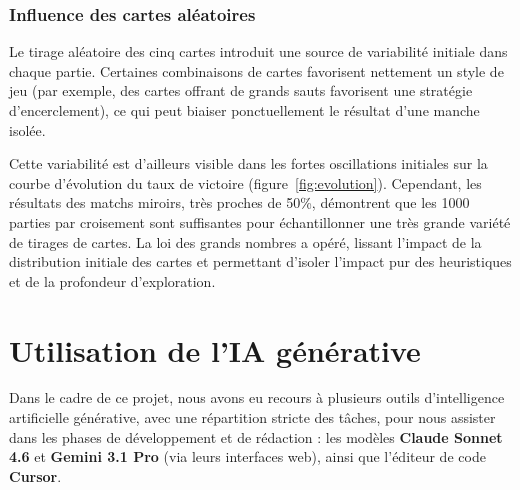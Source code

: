 \documentclass[12pt, a4paper]{article}
\begin{document}
\subsubsection{Influence des cartes aléatoires}

Le tirage aléatoire des cinq cartes introduit une source de variabilité initiale dans chaque partie.
Certaines combinaisons de cartes favorisent nettement un style de jeu (par exemple, des cartes
offrant de grands sauts favorisent une stratégie d'encerclement), ce qui peut biaiser ponctuellement
le résultat d'une manche isolée.

Cette variabilité est d'ailleurs visible dans les fortes oscillations initiales sur la courbe d'évolution du
taux de victoire (figure~\ref{fig:evolution}). Cependant, les résultats des matchs miroirs, très proches de 50\%, démontrent que les 1000 parties par croisement sont suffisantes pour échantillonner une
très grande variété de tirages de cartes. La loi des grands nombres a opéré, lissant l'impact de la distribution initiale des cartes et permettant d'isoler l'impact pur des heuristiques et de la profondeur d'exploration.

\section{Utilisation de l'IA générative}
\label{sec:ia_generative}

Dans le cadre de ce projet, nous avons eu recours à plusieurs outils d'intelligence artificielle 
générative, avec une répartition stricte des tâches, pour nous assister dans les phases de 
développement et de rédaction : les modèles \textbf{Claude Sonnet 4.6} et \textbf{Gemini 3.1 Pro} (via leurs 
interfaces web), ainsi que l'éditeur de code \textbf{Cursor}.
\end{document}
